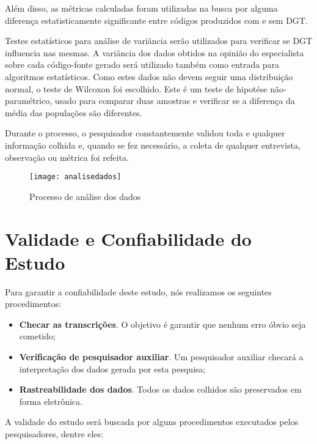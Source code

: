 Além disso, as métricas calculadas foram utilizadas na busca por alguma diferença
estatisticamente significante entre códigos produzidos com e sem DGT.
 
Testes estatísticos para análise de variância serão utilizados
para verificar se DGT influencia nas mesmas.
A variância dos dados obtidos na opinião do especialista sobre cada código-fonte gerado
será utilizado também como entrada para algoritmos estatísticos. 
Como estes dados não devem seguir uma distribuição normal, o teste
de Wilcoxon foi escolhido. Este é um teste de hipotése não-paramétrico,
usado para comparar duas amostras e verificar se a diferença da média das populações
são diferentes.

Durante o processo, o pesquisador constantemente validou toda e qualquer
informação colhida e, quando se fez necessário, a coleta de qualquer entrevista,
observação ou métrica foi refeita. 

\begin{figure}
  \centering
  \texttt{[image: analisedados]}
  \caption{Processo de análise dos dados}
  \label{fig:analise-dados}
\end{figure}

\section{Validade e Confiabilidade do Estudo}
\label{sec:planejamento-validacao}

Para garantir a confiabilidade deste estudo, nós realizamos os
seguintes procedimentos:

\begin{itemize}
	\item \textbf{Checar as transcrições}. O objetivo é garantir que nenhum erro
	óbvio seja cometido;

	\item \textbf{Verificação de pesquisador auxiliar}. Um pesquisador auxiliar
	checará a interpretação dos dados gerada por esta pesquisa;
	
	\item \textbf{Rastreabilidade dos dados}. Todos os dados colhidos são
	preservados em forma eletrônica.

\end{itemize}

A validade do estudo será buscada por alguns procedimentos executados pelos
pesquisadores, dentre eles:

